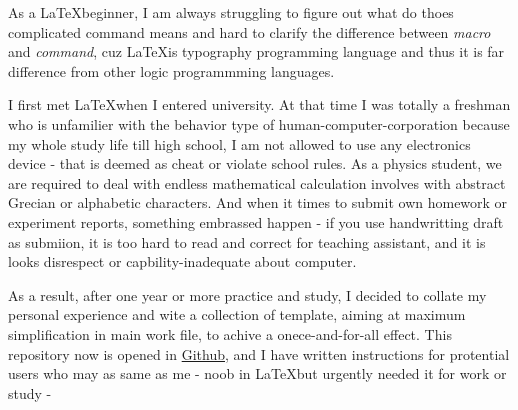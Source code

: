     As a \LaTeX beginner, I am always struggling  to figure out what do thoes complicated command means and hard to clarify the difference between \emph{macro} and \emph{command}, cuz \LaTeX is typography programming language and thus it is far difference from other logic programmming languages. 

    I first met \LaTeX when I entered university. At that time I was totally a freshman who is unfamilier with the behavior type of human-computer-corporation because my whole study life till high school, I am not allowed to use any electronics device - that is deemed as cheat or violate school rules. As a physics student, we are required to deal with endless mathematical calculation involves with abstract Grecian or alphabetic characters. And when it times to submit own homework or experiment reports, something embrassed happen - if you use handwritting draft as submiion, it is too hard to read and correct for teaching assistant, and it is looks disrespect or capbility-inadequate about computer. 
    
    As a result, after one year or more practice and study, I decided to collate my personal experience and wite a collection of template, aiming at maximum simplification in main work file, to achive a onece-and-for-all effect. This repository now is opened in \href{https://github.com/SweetPastry/spTemplate}{Github}, and I have written instructions for protential users who may as same as me - noob in \LaTeX but urgently needed it for work or study - 

